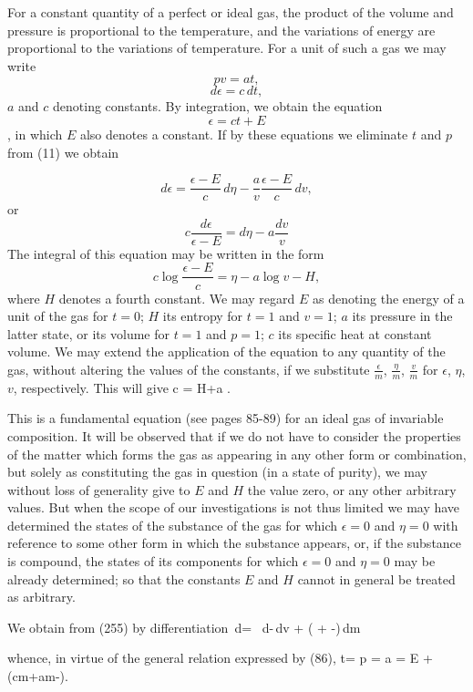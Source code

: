 \documentclass[12pt]{article}
\begin{document}
For a constant quantity of a perfect or ideal gas, the product of the volume and pressure is proportional to the temperature, and the variations of energy are proportional to the variations of temperature. For a unit of such a gas we may write
$$pv = at,$$
$$d\epsilon = c\,dt,$$
$a$ and $c$ denoting constants. By integration, we obtain the equation
$$\epsilon = ct+E$$,
in which $E$ also denotes a constant. If by these equations we eliminate $t$ and $p$ from (11) we obtain

$$d \epsilon = \frac{\epsilon -E}{c}\,d\eta-\frac{a}{v}\frac{\epsilon -E}{c}\,dv,$$
or   $$  c\frac{d\epsilon}{\epsilon-E}=d\eta -a\frac{dv}{v} $$
The integral of this equation may be written in the form
$$c \log \frac{\epsilon -E}{c} = \eta -a \log v - H,$$
where $H$ denotes a fourth constant. We may regard $E$ as denoting the energy of a unit of the gas for $t=0$; $H$ its entropy for $t= 1$ and $v= 1$; $a$ its pressure in the latter state, or its volume for $t =1$ and $p= 1$; $c$ its specific heat at constant volume. We may extend the application of the equation to any quantity of the gas, without altering the values of the constants, if we substitute $\frac{\epsilon}{m}$, $\frac{\eta}{m}$, $\frac{v}{m}$ for $\epsilon$, $\eta$, $v$, respectively. This will give
\eqs c \log {}= H+a \log{} . \label{255}\eqe

This is a fundamental equation (see pages 85-89) for an ideal gas of invariable composition. It will be observed that if we do not have to consider the properties of the matter which forms the gas as appearing in any other form or combination, but solely as constituting the gas in question (in a state of purity), we may without loss of generality give to $E$ and $H$ the value zero, or any other arbitrary values. But when the scope of our investigations is not thus limited we may have determined the states of the substance of the gas for which $\epsilon=0$ and $\eta = 0$ with reference to some other form in which the substance appears, or, if the substance is compound, the states of its components for which $\epsilon=0$ and $\eta = 0$ may be already determined; so that the constants $E$ and $H$ cannot in general be treated as arbitrary.


We obtain from (255) by differentiation
\eqs 
{}\,d\epsilon=  \, d\eta -\,dv + 
\left( + -\right)\,dm  
\label{256}\eqe

whence, in virtue of the general relation expressed by (86),
\eqs t=\label{257}\eqe
\eqs p = a    \label{258}\eqe
\eqs  \mu = E +  (cm+am-\eta).   \label{259}\eqe
\end{document}
